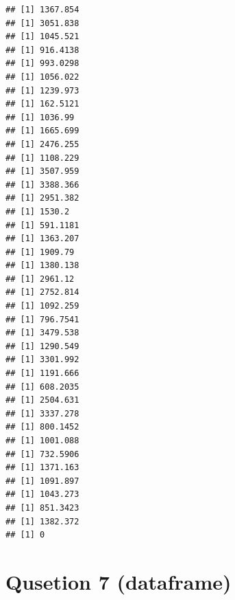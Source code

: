 \documentclass[
]{article}
\newenvironment{Shaded}{\begin{snugshade}}{\end{snugshade}}
\newcommand{\AttributeTok}[1]{\textcolor[rgb]{0.13,0.29,0.53}{#1}}
\newcommand{\ConstantTok}[1]{\textcolor[rgb]{0.56,0.35,0.01}{#1}}
\newcommand{\ControlFlowTok}[1]{\textcolor[rgb]{0.13,0.29,0.53}{\textbf{#1}}}
\newcommand{\DecValTok}[1]{\textcolor[rgb]{0.00,0.00,0.81}{#1}}
\newcommand{\FunctionTok}[1]{\textcolor[rgb]{0.13,0.29,0.53}{\textbf{#1}}}
\newcommand{\NormalTok}[1]{#1}
\newcommand{\OtherTok}[1]{\textcolor[rgb]{0.56,0.35,0.01}{#1}}
\newcommand{\SpecialCharTok}[1]{\textcolor[rgb]{0.81,0.36,0.00}{\textbf{#1}}}
\newcommand{\StringTok}[1]{\textcolor[rgb]{0.31,0.60,0.02}{#1}}
\begin{document}
\begin{verbatim}
## [1] 1367.854
## [1] 3051.838
## [1] 1045.521
## [1] 916.4138
## [1] 993.0298
## [1] 1056.022
## [1] 1239.973
## [1] 162.5121
## [1] 1036.99
## [1] 1665.699
## [1] 2476.255
## [1] 1108.229
## [1] 3507.959
## [1] 3388.366
## [1] 2951.382
## [1] 1530.2
## [1] 591.1181
## [1] 1363.207
## [1] 1909.79
## [1] 1380.138
## [1] 2961.12
## [1] 2752.814
## [1] 1092.259
## [1] 796.7541
## [1] 3479.538
## [1] 1290.549
## [1] 3301.992
## [1] 1191.666
## [1] 608.2035
## [1] 2504.631
## [1] 3337.278
## [1] 800.1452
## [1] 1001.088
## [1] 732.5906
## [1] 1371.163
## [1] 1091.897
## [1] 1043.273
## [1] 851.3423
## [1] 1382.372
## [1] 0
\end{verbatim}

\section{Qusetion 7 (dataframe)}\label{qusetion-7-dataframe}

\begin{Shaded}
\end{Shaded}
\end{document}
